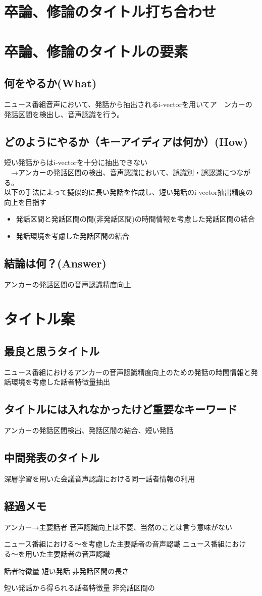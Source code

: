 \documentclass[11pt,a4paper]{jsarticle}
\begin{document}
%
%
\section*{卒論、修論のタイトル打ち合わせ}
\section{卒論、修論のタイトルの要素}
\subsection{何をやるか(What)}
ニュース番組音声において、発話から抽出されるi-vectorを用いてア　ンカーの発話区間を検出し、音声認識を行う。

\subsection{どのようにやるか（キーアイディアは何か）(How)}
短い発話からはi-vectorを十分に抽出できない\\
　→アンカーの発話区間の検出、音声認識において、誤識別・誤認識につながる。\\

以下の手法によって擬似的に長い発話を作成し、短い発話のi-vector抽出精度の向上を目指す
\begin{itemize}
\item 発話区間と発話区間の間(非発話区間)の時間情報を考慮した発話区間の結合
\item 発話環境を考慮した発話区間の結合
\end{itemize}

\subsection{結論は何？(Answer)}
アンカーの発話区間の音声認識精度向上

\section{タイトル案}

\subsection{最良と思うタイトル}
ニュース番組におけるアンカーの音声認識精度向上のための発話の時間情報と発話環境を考慮した話者特徴量抽出

\subsection{タイトルには入れなかったけど重要なキーワード}
アンカーの発話区間検出、発話区間の結合、短い発話

\subsection{中間発表のタイトル}
深層学習を用いた会議音声認識における同一話者情報の利用


\subsection{経過メモ}
アンカー→主要話者
音声認識向上は不要、当然のことは言う意味がない

ニュース番組における〜を考慮した主要話者の音声認識
ニュース番組における〜を用いた主要話者の音声認識

話者特徴量
短い発話
非発話区間の長さ

短い発話から得られる話者特徴量
非発話区間の



%
%
\end{document}
